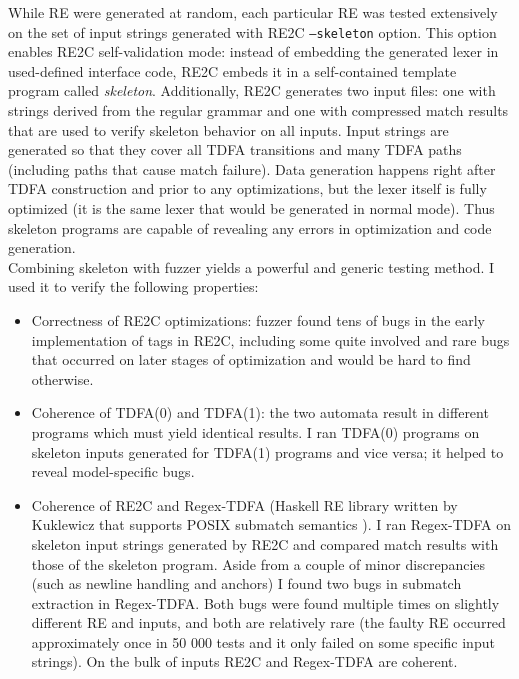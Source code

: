 \documentclass{article}
\theoremstyle{definition}
\begin{document}
\begin{multicols}{2}
While RE were generated at random, each particular RE was tested extensively
on the set of input strings generated with RE2C \texttt{--skeleton} option.
This option enables RE2C self-validation mode:
instead of embedding the generated lexer in used-defined interface code,
RE2C embeds it in a self-contained template program called \emph{skeleton}.
Additionally, RE2C generates two input files: one with strings derived from the regular grammar
and one with compressed match results that are used to verify skeleton behavior on all inputs.
Input strings are generated so that they cover all TDFA transitions and many TDFA paths
(including paths that cause match failure).
Data generation happens right after TDFA construction and prior to any optimizations,
but the lexer itself is fully optimized (it is the same lexer that would be generated in normal mode).
Thus skeleton programs are capable of revealing any errors in optimization and code generation.
\\

Combining skeleton with fuzzer yields a powerful and generic testing method.
I used it to verify the following properties:

\begin{itemize}
    \setlength{\parskip}{0.5em}

    \item Correctness of RE2C optimizations:
        fuzzer found tens of bugs in the early implementation of tags in RE2C,
        including some quite involved and rare bugs that occurred on later stages of optimization
        and would be hard to find otherwise.

    \item Coherence of TDFA(0) and TDFA(1):
        the two automata result in different programs which must yield identical results.
        I ran TDFA(0) programs on skeleton inputs generated for TDFA(1) programs and vice versa;
        it helped to reveal model-specific bugs.

    \item Coherence of RE2C and Regex-TDFA (Haskell RE library written by Kuklewicz that supports POSIX submatch semantics \cite{Regex-TDFA}).
        I ran Regex-TDFA on skeleton input strings generated by RE2C and compared match results with those of the skeleton program.
        Aside from a couple of minor discrepancies (such as newline handling and anchors)
        I found two bugs in submatch extraction in Regex-TDFA.
        Both bugs were found multiple times on slightly different RE and inputs,
        and both are relatively rare (the faulty RE occurred approximately once in 50 000 tests
        and it only failed on some specific input strings).
        On the bulk of inputs RE2C and Regex-TDFA are coherent.


\end{itemize}
\end{multicols}
\end{document}
